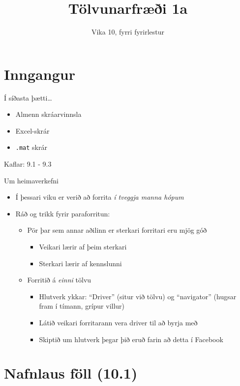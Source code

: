 \documentclass{beamer}
\title{Tölvunarfræði 1a}
\subtitle{Vika 10, fyrri fyrirlestur}
\begin{document}
\begin{frame}
\titlepage
\end{frame}

\section{Inngangur}

\begin{frame}{Í síðasta þætti\ldots}
\begin{itemize}
 \item Almenn skráarvinnsla
 \item Excel-skrár
 \item \texttt{.mat} skrár
\end{itemize}
Kaflar: 9.1 - 9.3 
\end{frame}

\begin{frame}{Um heimaverkefni}
\begin{itemize}
 \item Í þessari viku er verið að forrita \emph{í tveggja manna hópum}
 \item Ráð og trikk fyrir paraforritun:
 \begin{itemize}
  \item Pör þar sem annar aðilinn er sterkari forritari eru mjög góð
  \begin{itemize}
   \item Veikari lærir af þeim sterkari
   \item Sterkari lærir af kennslunni
  \end{itemize}
  \item Forritið á \emph{einni} tölvu
  \begin{itemize}
   \item Hlutverk ykkar: ``Driver'' (situr við tölvu) og ``navigator'' (hugsar fram í tímann, grípur villur)
   \item Látið veikari forritarann vera driver til að byrja með
   \item Skiptið um hlutverk þegar þið eruð farin að detta í Facebook
  \end{itemize}
 \end{itemize}
\end{itemize}
\end{frame}


\section{Nafnlaus föll (10.1)}
\end{document}

